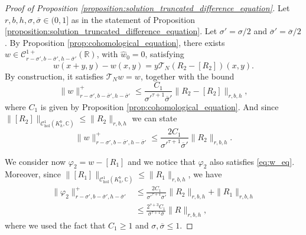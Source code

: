 \documentclass[10pt]{article}
\newcommand{\R}{\mathbb{R}}
\newcommand{\CC}{\mathbb{C}}
\begin{document}
\begin{proof}[Proof of Proposition \ref{proposition:solution_truncated_difference_equation}]
Let $r,b,h,\sigma,\overline\sigma\in(0,1]$ as in the statement of Proposition \ref{proposition:solution_truncated_difference_equation}. Let $\sigma' = \sigma/2$ and $\overline\sigma' = \overline\sigma/2$. By Proposition \ref{prop:cohomological_equation}, there exists $w\in\mathscr C^{1+}_{r-\sigma',b-\overline\sigma',h-\overline\sigma'}(\R)$, with $\widehat w_0=0$, satisfying
 \begin{equation}\label{eq:w_eq}
 w(x+y,y)-w(x,y) = y\mathscr T_N(R_2 -[R_2])(x, y).
 \end{equation}
 By construction, it satisfies $\mathscr T_N w = w$, together with the bound 
 \[
 \|w\|_{r-\sigma',b-\overline\sigma',h-\overline\sigma'}^+\leq \frac{C_1}{{\sigma'}^{\tau+1}{\overline\sigma'}}\|R_2-[R_2]\|_{r,b,h},
 \]
 where $C_1$ is given by Proposition \ref{prop:cohomological_equation}. 
 And since 
 $\|[R_2]\|_{\mathscr C_{\text{hol}}^1(K_h^b,\CC)} \leq \|R_2\|_{r,b,h}$ we can state
  \[
 \|w\|_{r-\sigma',b-\overline\sigma',h-\overline\sigma'}^+\leq \frac{2C_1}{{\sigma'}^{\tau+1}{\overline\sigma'}}\|R_2\|_{r,b,h}.
 \]
 
We consider now $\varphi_2=w - [R_1]$ and we notice that $\varphi_2$ also satisfies \eqref{eq:w_eq}.
Moreover, since
 $\|[R_1]\|_{\mathscr C_{\text{hol}}^1(K_h^b,\CC)} \leq \|R_1\|_{r,b,h}$, we have
 \begin{equation}
 \label{equation:intermediate_phi2}
 \begin{aligned}
 \|\varphi_2\|_{r-\sigma',b-\overline\sigma',h-\overline\sigma'}^+ 
    &\leq \frac{2C_1}{{\sigma'}^{\tau+1}{\overline\sigma'}}
    \|R_2\|_{r,b,h}
    +\|R_1\|_{r,b,h} \\  
    & \leq \frac{2^{\tau+3}C_1}{\sigma^{\tau+1}\overline\sigma}\|R\|_{r,b,h},
 \end{aligned}
 \end{equation}
 where we used the fact that $C_1\geq 1$ and $\sigma,\overline\sigma\leq1$. 
 

\end{proof}
\end{document}
